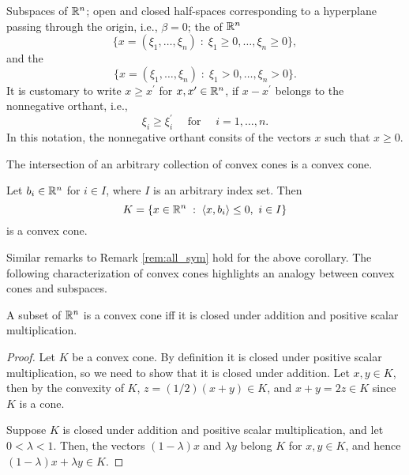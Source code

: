 \documentclass[11pt,a4paper]{article}
\begin{document}
\begin{example}\label{eg:nonneg_notation}
    Subspaces of $\mathbb{R}^n$; open and closed half-spaces corresponding to a hyperplane passing through the origin, i.e., $\beta = 0$; the  of $\mathbb{R}^n$
    \begin{equation*}
        \{x = (\xi_1,\ldots,\xi_n)\;:\; \xi_1\ge 0,\ldots, \xi_n\ge 0\},
    \end{equation*}
    and the 
    \begin{equation*}
        \{x = (\xi_1,\ldots,\xi_n)\;:\; \xi_1> 0,\ldots, \xi_n > 0\}.
    \end{equation*}
    It is customary to write $x\ge x^\prime$ for $x,x^\prime\in\mathbb{R}^n$, if $x-x^\prime$ belongs to the nonnegative orthant, i.e., 
    \begin{equation*}
        \xi_i\ge \xi_i^\prime\quad \text{ for }\quad i = 1,\ldots,n.
    \end{equation*}
    In this notation, the nonnegative orthant consits of the vectors $x$ such that $x\ge 0.$
\end{example}

\begin{lemma}\label{lem:intersection_convex_cones}
    The intersection of an arbitrary collection of convex cones is a convex cone.
\end{lemma}

\begin{corollary}
    Let $b_i\in\mathbb{R}^n$ for $i\in I$, where $I$ is an arbitrary index set. Then 
    \begin{equation*}
        K = \{x\in\mathbb{R}^n\;:\; \langle x, b_i \rangle\le 0,\ i\in I\}
    \end{equation*}
    is a convex cone.
\end{corollary}

Similar remarks to Remark \ref{rem:all_sym} hold for the above corollary.
% 
The following characterization of convex cones highlights an analogy between convex cones and subspaces.

\begin{theorem}\label{thm:convex_cone_conic_combinations}
    A subset of $\mathbb{R}^n$ is a convex cone iff it is closed under addition and positive scalar multiplication.
\end{theorem}

\begin{proof}
    \forward Let $K$ be a convex cone. By definition it is closed under positive scalar multiplication, so we need to show that it is closed under addition. Let $x,y\in K$, then by the convexity of $K$, $z = (1/2)(x+y)\in K$, and $x+y = 2z \in K$ since $K$ is a cone.
    
    \noindent\converse Suppose $K$ is closed under addition and positive scalar multiplication, and let $0<\lambda<1$. Then, the vectors $(1-\lambda)x$ and $\lambda y$ belong $K$ for $x,y\in K$, and hence $(1-\lambda)x+\lambda y\in K$. 
\end{proof}
\end{document}
